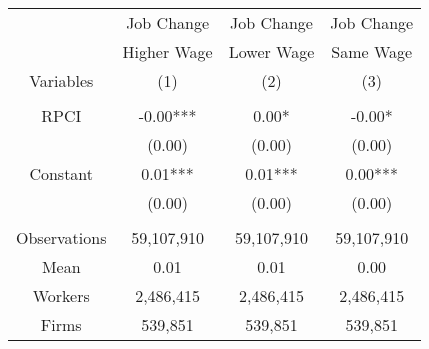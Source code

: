 \begin{tabular}{c|ccc}
\toprule
\toprule
      & Job Change & Job Change & Job Change \\
      & Higher Wage & Lower Wage & Same Wage \\
Variables & (1)   & (2)   & (3) \\
\midrule
      &       &       &  \\
RPCI  & -0.00*** & 0.00* & -0.00* \\
      & (0.00) & (0.00) & (0.00) \\
Constant & 0.01*** & 0.01*** & 0.00*** \\
      & (0.00) & (0.00) & (0.00) \\
      &       &       &  \\
\midrule
Observations & 59,107,910 & 59,107,910 & 59,107,910 \\
Mean  & 0.01  & 0.01  & 0.00 \\
Workers & 2,486,415 & 2,486,415 & 2,486,415 \\
Firms & 539,851 & 539,851 & 539,851 \\
\bottomrule
\bottomrule
\end{tabular}%
